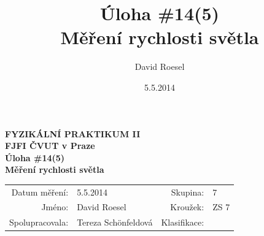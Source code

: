 \documentclass[english]{article}
\newcommand{\Author}{David Roesel}
\newcommand{\Coauthor}{Tereza Schönfeldová}
\newcommand{\Institute}{FJFI ČVUT v Praze}
\newcommand{\Subject}{FYZIKÁLNÍ PRAKTIKUM II}
\newcommand{\Group}{7}
\newcommand{\Circle}{ZS 7}
\newcommand{\Title}{Úloha \#14(5)  \\Měření rychlosti světla}
\newcommand{\Date}{5.5.2014}
\begin{document}
\author{\Author}
\title{\Title}
\date{\Date}

\renewcommand{\figurename}{Obr.}
\renewcommand{\tablename}{Tab.}
\renewcommand{\refname}{Reference}


\setlength{\parindent}{0cm}
\begin{multicols}{2}
\textbf{\Subject \\
        \Institute \\[0.1cm]
\Title \\[0.5cm]
}
\begin{tabular}{rlrl}
\large Datum měření: & \Date & \large Skupina: & \Group \\
\large Jméno: & \Author & \large Kroužek:  & \Circle\\
\large Spolupracovala: & \Coauthor &\large Klasifikace:\\
\end{tabular}


\end{multicols}
\end{document}
